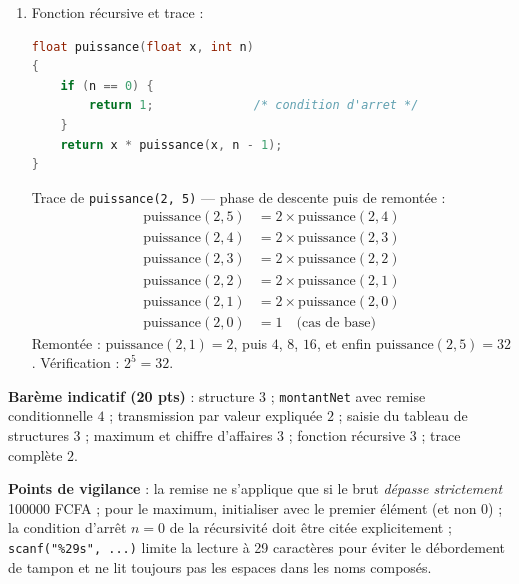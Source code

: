 \documentclass[11pt]{article}
\begin{document}
\begin{corrige}
\begin{enumerate}
\begin{lstlisting}[language=C]
    for (i = 0; i < 5; i++) {
        net = montantNet(clients[i]);
        printf("%s doit payer %.0f FCFA\n", clients[i].nom, net);
        caTotal += net;
        if (i == 0 || net > netMax) {
            netMax = net;
            iMax = i;
        }
    }
    printf("Meilleur client : %s (%.0f FCFA)\n",
           clients[iMax].nom, netMax);
    printf("Chiffre d'affaires total : %.0f FCFA\n", caTotal);
    return 0;
}
\end{lstlisting}
\item Fonction récursive et trace :
\begin{lstlisting}[language=C]
float puissance(float x, int n)
{
    if (n == 0) {
        return 1;              /* condition d'arret */
    }
    return x * puissance(x, n - 1);
}
\end{lstlisting}
Trace de \texttt{puissance(2, 5)} — phase de descente puis de remontée :
\begin{align*}
\text{puissance}(2,5) &= 2 \times \text{puissance}(2,4)\\
\text{puissance}(2,4) &= 2 \times \text{puissance}(2,3)\\
\text{puissance}(2,3) &= 2 \times \text{puissance}(2,2)\\
\text{puissance}(2,2) &= 2 \times \text{puissance}(2,1)\\
\text{puissance}(2,1) &= 2 \times \text{puissance}(2,0)\\
\text{puissance}(2,0) &= 1 \quad \text{(cas de base)}
\end{align*}
Remontée : $\text{puissance}(2,1) = 2$, puis $4$, $8$, $16$, et enfin $\text{puissance}(2,5) = 32$. Vérification : $2^5 = 32$.
\end{enumerate}
\textbf{Barème indicatif (20 pts)} : structure $3$ ; \texttt{montantNet} avec remise conditionnelle $4$ ; transmission par valeur expliquée $2$ ; saisie du tableau de structures $3$ ; maximum et chiffre d'affaires $3$ ; fonction récursive $3$ ; trace complète $2$.

\textbf{Points de vigilance} : la remise ne s'applique que si le brut \emph{dépasse strictement} \num{100000} FCFA ; pour le maximum, initialiser avec le premier élément (et non $0$) ; la condition d'arrêt $n = 0$ de la récursivité doit être citée explicitement ; \texttt{scanf("\%29s", ...)} limite la lecture à 29 caractères pour éviter le débordement de tampon et ne lit toujours pas les espaces dans les noms composés.
\end{corrige}
\end{document}
